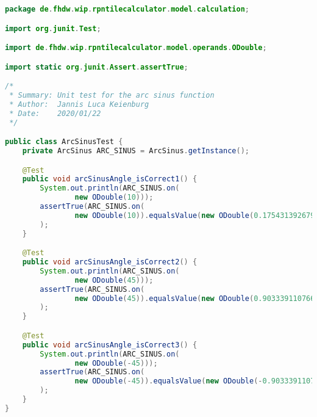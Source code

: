 \begin{lstlisting}[caption=ArcSinusTest (Keienburg),label=list:ArcSinusTest,language=Java]
package de.fhdw.wip.rpntilecalculator.model.calculation;

import org.junit.Test;

import de.fhdw.wip.rpntilecalculator.model.operands.ODouble;

import static org.junit.Assert.assertTrue;

/*
 * Summary: Unit test for the arc sinus function
 * Author:  Jannis Luca Keienburg
 * Date:    2020/01/22
 */

public class ArcSinusTest {
    private ArcSinus ARC_SINUS = ArcSinus.getInstance();

    @Test
    public void arcSinusAngle_isCorrect1() {
        System.out.println(ARC_SINUS.on(
                new ODouble(10)));
        assertTrue(ARC_SINUS.on(
                new ODouble(10)).equalsValue(new ODouble(0.17543139267904395))
        );
    }

    @Test
    public void arcSinusAngle_isCorrect2() {
        System.out.println(ARC_SINUS.on(
                new ODouble(45)));
        assertTrue(ARC_SINUS.on(
                new ODouble(45)).equalsValue(new ODouble(0.9033391107665127))
        );
    }

    @Test
    public void arcSinusAngle_isCorrect3() {
        System.out.println(ARC_SINUS.on(
                new ODouble(-45)));
        assertTrue(ARC_SINUS.on(
                new ODouble(-45)).equalsValue(new ODouble(-0.9033391107665127))
        );
    }
}
\end{lstlisting}    

